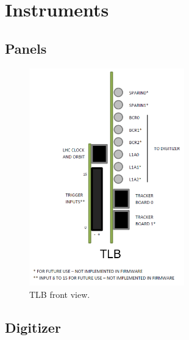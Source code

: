 \chapter{Instruments}
\section{Panels}
\label{Panels}

\begin{figure}
  \centering
    \includegraphics[width=0.6\textwidth]{Appendix2/Pictures/TLBFrontView.png}
    \caption{TLB front view.}
    \label{fig:TLBFrontView}   
\end{figure}

\section{Digitizer}

